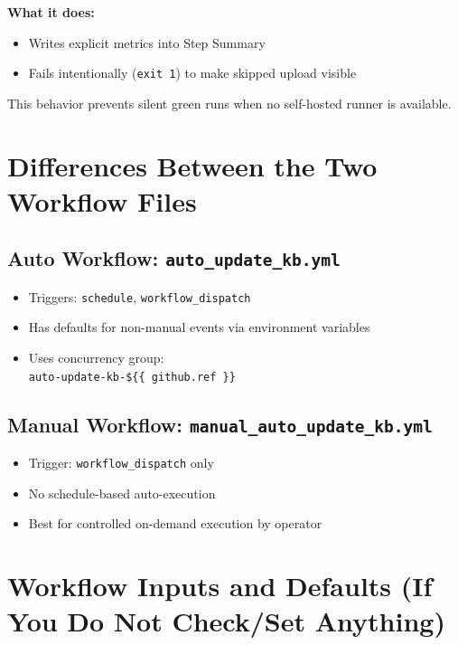 \documentclass[11pt,a4paper]{article}
\begin{document}
\textbf{What it does:}
\begin{itemize}
  \item Writes explicit metrics into Step Summary
  \item Fails intentionally (\texttt{exit 1}) to make skipped upload visible
\end{itemize}

This behavior prevents silent green runs when no self-hosted runner is available.

\section{Differences Between the Two Workflow Files}
\subsection{Auto Workflow: \texttt{auto\_update\_kb.yml}}
\begin{itemize}
  \item Triggers: \texttt{schedule}, \texttt{workflow\_dispatch}
  \item Has defaults for non-manual events via environment variables
  \item Uses concurrency group:\\
  \texttt{auto-update-kb-\$\{\{ github.ref \}\}}
\end{itemize}

\subsection{Manual Workflow: \texttt{manual\_auto\_update\_kb.yml}}
\begin{itemize}
  \item Trigger: \texttt{workflow\_dispatch} only
  \item No schedule-based auto-execution
  \item Best for controlled on-demand execution by operator
\end{itemize}

\section{Workflow Inputs and Defaults (If You Do Not Check/Set Anything)}
\end{document}
